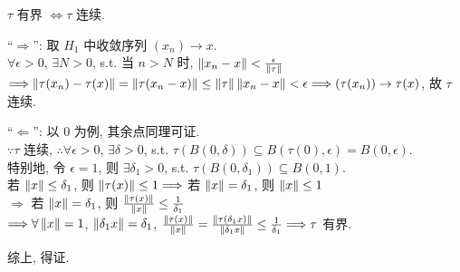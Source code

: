 \documentclass{note}
\begin{document}
\begin{thm}[(课本定理 13.31)]
    $\tau$ 有界 $\Longleftrightarrow\tau$ 连续.
\end{thm}
\begin{pf}
    ``$\Longrightarrow$'': 取 $H_1$ 中收敛序列 $(x_n)\rightarrow x$.\\
    $\forall\epsilon>0$, $\exists N>0$, s.t. 当 $n>N$ 时, $\left\lVert x_n-x\right\rVert<\frac{\epsilon}{\left\lVert\tau\right\rVert}$\\
    $\Longrightarrow\left\lVert\tau(x_n)-\tau(x)\right\rVert=\left\lVert\tau(x_n-x)\right\rVert\leq\left\lVert\tau\right\rVert\left\lVert x_n-x\right\rVert<\epsilon\Longrightarrow(\tau(x_n))\rightarrow\tau(x)$, 故 $\tau$ 连续.

    ``$\Longleftarrow$'': 以 $0$ 为例, 其余点同理可证.\\
    $\because\tau$ 连续, $\therefore\forall\epsilon>0$, $\exists\delta>0$, s.t. $\tau(B(0,\delta))\subseteq B(\tau(0),\epsilon)=B(0,\epsilon)$.\\
    特别地, 令 $\epsilon=1$, 则 $\exists\delta_1>0$, s.t. $\tau(B(0,\delta_1))\subseteq B(0,1)$.\\
    若 $\left\lVert x\right\rVert\leq\delta_1$, 则 $\left\lVert\tau(x)\right\rVert\leq 1\Longrightarrow$ 若 $\left\lVert x\right\rVert=\delta_1$, 则 $\left\lVert x\right\rVert\leq 1$\\
    $\Longrightarrow$ 若 $\left\lVert x\right\rVert=\delta_1$, 则 $\frac{\left\lVert\tau(x)\right\rVert}{\left\lVert x\right\rVert}\leq\frac{1}{\delta_1}$\\
    $\Longrightarrow\forall\left\lVert x\right\rVert=1$, $\left\lVert\delta_1x\right\rVert=\delta_1$, $\frac{\left\lVert\tau(x)\right\rVert}{\left\lVert x\right\rVert}=\frac{\left\lVert\tau(\delta_1x)\right\rVert}{\left\lVert\delta_1x\right\rVert}\leq\frac{1}{\delta_1}\Longrightarrow\tau$ 有界.

    综上, 得证.
\end{pf}
\end{document}
